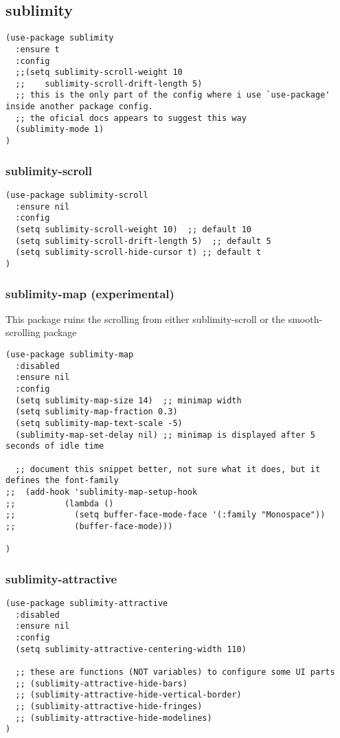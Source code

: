 \documentclass[11pt]{article}
\begin{document}
\subsection*{sublimity}
\label{sec:org2378677}

\begin{verbatim}
(use-package sublimity
  :ensure t
  :config
  ;;(setq sublimity-scroll-weight 10
  ;;    sublimity-scroll-drift-length 5)
  ;; this is the only part of the config where i use `use-package' inside another package config.
  ;; the oficial docs appears to suggest this way
  (sublimity-mode 1)
)
\end{verbatim}

\subsubsection*{sublimity-scroll}
\label{sec:org78513e2}
\begin{verbatim}
(use-package sublimity-scroll
  :ensure nil
  :config
  (setq sublimity-scroll-weight 10)  ;; default 10
  (setq sublimity-scroll-drift-length 5)  ;; default 5
  (setq sublimity-scroll-hide-cursor t) ;; default t
)
\end{verbatim}

\subsubsection*{sublimity-map (experimental)}
\label{sec:org9002bc8}
This package ruins the scrolling from either sublimity-scroll or the smooth-scrolling package
\begin{verbatim}
(use-package sublimity-map
  :disabled
  :ensure nil
  :config
  (setq sublimity-map-size 14)  ;; minimap width
  (setq sublimity-map-fraction 0.3)
  (setq sublimity-map-text-scale -5)
  (sublimity-map-set-delay nil) ;; minimap is displayed after 5 seconds of idle time

  ;; document this snippet better, not sure what it does, but it defines the font-family
;;  (add-hook 'sublimity-map-setup-hook
;;          (lambda ()
;;            (setq buffer-face-mode-face '(:family "Monospace"))
;;            (buffer-face-mode)))

)
\end{verbatim}

\subsubsection*{sublimity-attractive}
\label{sec:org4e9d67a}
\begin{verbatim}
(use-package sublimity-attractive
  :disabled
  :ensure nil
  :config
  (setq sublimity-attractive-centering-width 110)

  ;; these are functions (NOT variables) to configure some UI parts
  ;; (sublimity-attractive-hide-bars)
  ;; (sublimity-attractive-hide-vertical-border)
  ;; (sublimity-attractive-hide-fringes)
  ;; (sublimity-attractive-hide-modelines)
)

\end{verbatim}
\end{document}
